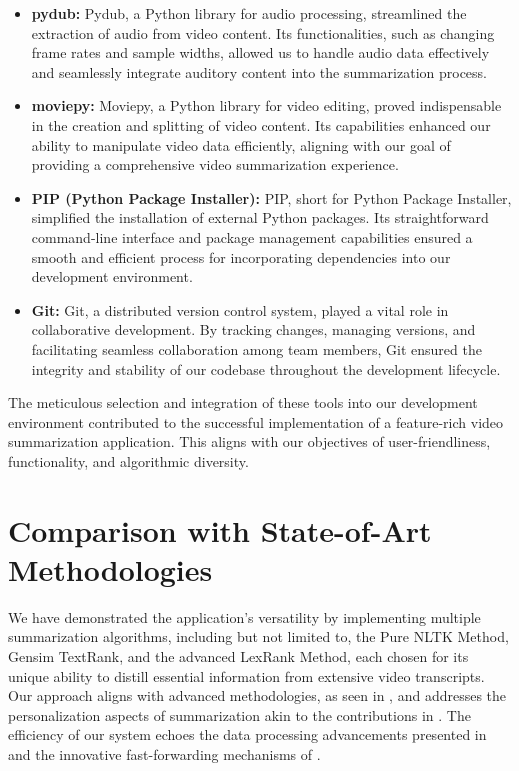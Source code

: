 \documentclass{ieeeaccess}
\begin{document}
\begin{itemize}
    \item \textbf{pydub:} Pydub, a Python library for audio processing, streamlined the extraction of audio from video content. Its functionalities, such as changing frame rates and sample widths, allowed us to handle audio data effectively and seamlessly integrate auditory content into the summarization process.

    \item \textbf{moviepy:} Moviepy, a Python library for video editing, proved indispensable in the creation and splitting of video content. Its capabilities enhanced our ability to manipulate video data efficiently, aligning with our goal of providing a comprehensive video summarization experience.

    \item \textbf{PIP (Python Package Installer):} PIP, short for Python Package Installer, simplified the installation of external Python packages. Its straightforward command-line interface and package management capabilities ensured a smooth and efficient process for incorporating dependencies into our development environment.

    \item \textbf{Git:} Git, a distributed version control system, played a vital role in collaborative development. By tracking changes, managing versions, and facilitating seamless collaboration among team members, Git ensured the integrity and stability of our codebase throughout the development lifecycle.
\end{itemize}
The meticulous selection and integration of these tools into our development environment contributed to the successful implementation of a feature-rich video summarization application. This aligns with our objectives of user-friendliness, functionality, and algorithmic diversity.

\section{Comparison with State-of-Art Methodologies}
\label{Comparison with State-of-Art Methodologies}
We have demonstrated the application's versatility by implementing multiple summarization algorithms, including but not limited to, the Pure NLTK Method, Gensim TextRank, and the advanced LexRank Method, each chosen for its unique ability to distill essential information from extensive video transcripts. Our approach aligns with advanced methodologies, as seen in \cite{ref9}, and addresses the personalization aspects of summarization akin to the contributions in \cite{ref7}. The efficiency of our system echoes the data processing advancements presented in \cite{ref6} and the innovative fast-forwarding mechanisms of \cite{ref10}.
\end{document}
